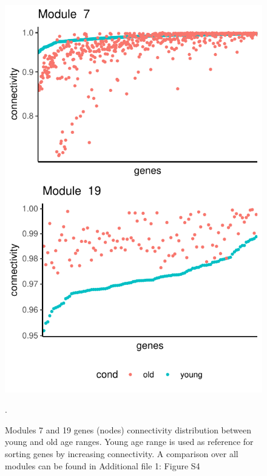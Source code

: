 \begin{figure}[!ht]
    \centering
    \includegraphics{img/chap1/figure_3.pdf}
    \caption{Modules 7 and 19 genes (nodes) connectivity distribution between young and old age ranges. Young age range is used as reference for sorting genes by increasing connectivity. A comparison over all modules can be found in Additional file 1: Figure S4}.
    \label{fig:fig_connectivity_drop}
\end{figure}


